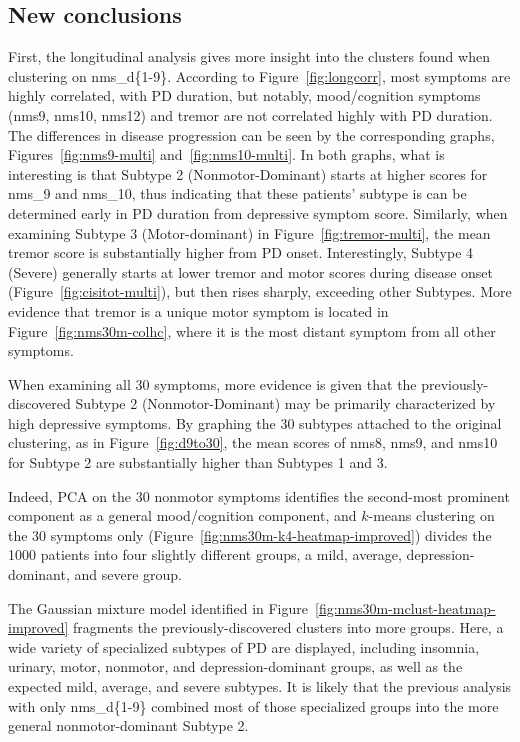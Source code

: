\documentclass[preprint,3p]{elsarticle} %
\begin{document}
\subsection{New conclusions}
\label{ssec:newconc}

First, the longitudinal analysis gives more insight into the clusters found when clustering on
nms\_d\{1-9\}. According to Figure~\ref{fig:longcorr}, most symptoms are highly correlated, with PD
duration, but notably, mood/cognition symptoms (nms9, nms10, nms12) and tremor are not correlated
highly with PD duration. The differences in disease progression can be seen by the corresponding
graphs, Figures~\ref{fig:nms9-multi} and~\ref{fig:nms10-multi}. In both graphs, what is interesting
is that Subtype 2 (Nonmotor-Dominant) starts at higher scores for nms\_9 and nms\_10, thus
indicating that these patients' subtype is can be determined early in PD duration from depressive
symptom score. Similarly, when examining Subtype 3 (Motor-dominant) in
Figure~\ref{fig:tremor-multi}, the mean tremor score is substantially higher from PD onset.
Interestingly, Subtype 4 (Severe) generally starts at lower tremor and motor scores during disease
onset (Figure~\ref{fig:cisitot-multi}), but then rises sharply, exceeding other Subtypes. More evidence
that tremor is a unique motor symptom is located in Figure~\ref{fig:nms30m-colhc}, where it is the most
distant symptom from all other symptoms.

When examining all 30 symptoms, more evidence is given that the previously-discovered Subtype
2 (Nonmotor-Dominant) may be primarily characterized by high depressive symptoms. By graphing the
30 subtypes attached to the original clustering, as in Figure~\ref{fig:d9to30}, the mean scores of
nms8, nms9, and nms10 for Subtype 2 are substantially higher than Subtypes 1 and 3.

Indeed, PCA on the 30 nonmotor symptoms identifies the second-most prominent component as a general
mood/cognition component, and $k$-means clustering on the 30 symptoms only
(Figure~\ref{fig:nms30m-k4-heatmap-improved}) divides the 1000 patients into four slightly
different groups, a mild, average, depression-dominant, and severe group.

The Gaussian mixture model identified in Figure~\ref{fig:nms30m-mclust-heatmap-improved} fragments
the previously-discovered clusters into more groups. Here, a wide variety of specialized subtypes
of PD are displayed, including insomnia, urinary, motor, nonmotor, and depression-dominant groups,
as well as the expected mild, average, and severe subtypes. It is likely that the previous analysis
with only nms\_d\{1-9\} combined most of those specialized groups into the more general
nonmotor-dominant Subtype 2.
\end{document}

